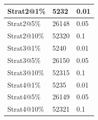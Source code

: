 \begin{figure}[!t]
\begin{minipage}[t]{0.495\columnwidth}
{\begin{tabular}{|l|l|l|}
Strat2@1\%                                                   & 5232                                                   & 0.01                                                    \\ \hline
Strat2@5\%                                                   & 26148                                                  & 0.05                                                    \\ \hline
Strat2@10\%                                                  & 52320                                                  & 0.1                                                     \\ \hline
Strat3@1\%                                                   & 5240                                                   & 0.01                                                    \\ \hline
Strat3@5\%                                                   & 26150                                                  & 0.05                                                    \\ \hline
Strat3@10\%                                                  & 52315                                                  & 0.1                                                     \\ \hline
Strat4@1\%                                                   & 5235                                                   & 0.01                                                    \\ \hline
Strat4@5\%                                                   & 26149                                                  & 0.05                                                    \\ \hline
Strat4@10\%                                                  & 52321                                                  & 0.1                                                     \\ \hline
\end{tabular}
}
\label{tab:flights_samples}
\end{minipage}%
\hfill
\begin{minipage}[t]{0.495\columnwidth}
\vspace{0pt}
\begin{minipage}[t]{1.0\columnwidth}
\begin{minipage}[t]{1.0\columnwidth}
\vspace{0pt}
\scalebox{0.65}{
}
\end{minipage}
\end{minipage}
\end{minipage}
\end{figure}
